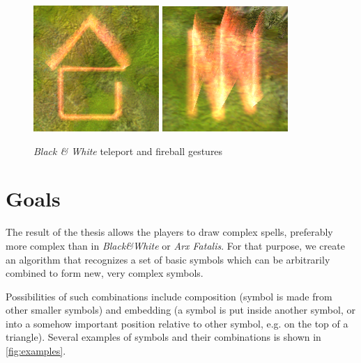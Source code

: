 \begin{description}
\begin{figure}
\centering
\includegraphics[width=.3\linewidth]{ext/gestureteleport.png}
\quad
\includegraphics[width=.3\linewidth]{ext/gesturefireball.png}
\caption{\emph{Black \& White} teleport and fireball gestures}
\label{fig:blackwhite}
\end{figure}

\end{description}

\section{Goals}

The result of the thesis allows the players to draw complex spells, preferably more complex than in \emph{Black\&White} or \emph{Arx Fatalis}. For that purpose, we create an algorithm that recognizes a set of basic symbols which can be arbitrarily combined to form new, very complex symbols.

Possibilities of such combinations include composition (symbol is made from other smaller symbols) and embedding (a symbol is put inside another symbol, or into a somehow important position relative to other symbol, e.g. on the top of a triangle). Several examples of symbols and their combinations is shown in \cref{fig:examples}.

